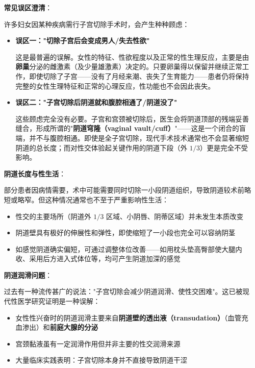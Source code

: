 \vspace{0.5em}
\noindent\textbf{常见误区澄清}：

许多妇女因某种疾病需行子宫切除手术时，会产生种种顾虑：

\begin{itemize}
	\item \textbf{误区一："切除子宫后会变成男人/失去性欲"}
	
	这是最普遍的误解。女性的特征、性欲程度以及正常的性生理反应，主要是由\textbf{卵巢}分泌的雌激素（及少量雄激素）决定的。只要卵巢得以保留并继续正常工作，即使切除了子宫——没有了月经来潮、丧失了生育能力——患者仍将保持完整的女性生理特征和正常的心理反应，性功能也不会因此丧失。

	\item \textbf{误区二："子宫切除后阴道就和腹腔相通了/阴道没了"}
	
	这些顾虑完全没有必要。子宫和宫颈被切除后，医生会将阴道顶部的残端妥善缝合，形成所谓的"\textbf{阴道穹隆（vaginal vault/cuff）}"——这是一个闭合的盲端，并不与腹腔相通。即使是全子宫切除，现代手术技术通常也不会显著缩短阴道的总长度；而对性交体验起关键作用的阴道下段（外 $1/3$）更是完全不受影响。
\end{itemize}

\vspace{0.5em}
\noindent\textbf{阴道长度与性生活}：

部分患者因病情需要，术中可能需要同时切除一小段阴道组织，导致阴道较术前略短或略窄。但这种情况通常也不至于严重影响性生活：
\begin{itemize}
	\item 性交的主要场所（阴道外 $1/3$ 区域、小阴唇、阴蒂区域）并未发生本质改变
	\item 阴道壁具有极好的伸展性和弹性，即使缩短了一小段也完全可以容纳阴茎
	\item 如感觉阴道确实偏短，可通过调整体位改善——如用枕头垫高臀部使大腿内收、采用后方进入式体位等，均可产生阴道加深的感觉
\end{itemize}

\vspace{0.5em}
\noindent\textbf{阴道润滑问题}：

过去有一种流传甚广的说法："子宫切除会减少阴道润滑、使性交困难"。这已被现代性医学研究证明是一种误解：
\begin{itemize}
	\item 女性性兴奋时的阴道润滑主要来自\textbf{阴道壁的透出液（transudation）}（血管充血渗出）和\textbf{前庭大腺的分泌}
	\item 宫颈黏液虽有一定润滑作用但并非主要的性交润滑来源
	\item 大量临床实践表明：子宫切除本身并不直接导致阴道干涩
\end{itemize}

